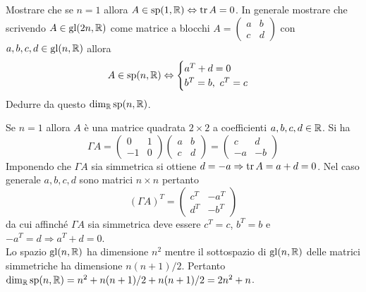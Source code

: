\begin{exercise}
    Mostrare che se $ n = 1 $ allora $ A \in \mathrm{sp}(1, \mathbb{R}) \Leftrightarrow \operatorname{tr}{A} = 0 $. In generale mostrare che scrivendo $ A \in \mathrm{gl}(2n, \mathbb{R}) $ come matrice a blocchi $ A = \begin{pmatrix} a & b \\ c & d \end{pmatrix} $ con $ a, b, c, d \in \mathrm{gl}(n, \mathbb{R}) $ allora
    \[
        A \in \mathrm{sp}(n, \mathbb{R}) \Leftrightarrow
        \begin{cases}
            a^T + d = 0 \\
            b^T = b, \ c^T = c
        \end{cases}
    \]
    Dedurre da questo $ \dim_{\mathbb{R}} {\mathrm{sp}(n, \mathbb{R})} $.
\end{exercise}
\begin{solution}
    Se $ n = 1 $ allora $ A $ è una matrice quadrata $ 2 \times 2 $ a coefficienti $ a, b, c, d \in \mathbb{R} $. Si ha
    \[
        \Gamma A = 
        \begin{pmatrix}
            0 & 1 \\
            -1 & 0
        \end{pmatrix}
        \begin{pmatrix}
            a & b \\
            c & d
        \end{pmatrix}
        =
        \begin{pmatrix}
            c & d \\
            -a & -b
        \end{pmatrix}
    \]
    Imponendo che $ \Gamma A $ sia simmetrica si ottiene $ d = -a \Rightarrow \operatorname{tr}{A} = a + d = 0 $. Nel caso generale $ a, b, c, d $ sono matrici $ n \times n $ pertanto
    \[
        (\Gamma A)^T =
        \begin{pmatrix}
            c^T & -a^T \\
            d^T & -b^T
        \end{pmatrix}
    \]
    da cui affinché $ \Gamma A $ sia simmetrica deve essere $ c^T = c $, $ b^T = b $ e $ -a^T = d \Rightarrow a^T + d = 0 $. \\
    Lo spazio $ \mathrm{gl}(n, \mathbb{R}) $ ha dimensione $ n^2 $ mentre il sottospazio di $ \mathrm{gl}(n, \mathbb{R}) $ delle matrici simmetriche ha dimensione $ n(n+1)/2 $. Pertanto $ \dim_{\mathbb{R}} \mathrm{sp}(n, \mathbb{R}) = n^2 + n(n+1)/2 + n(n+1)/2 = 2n^2 + n $.
\end{solution}


